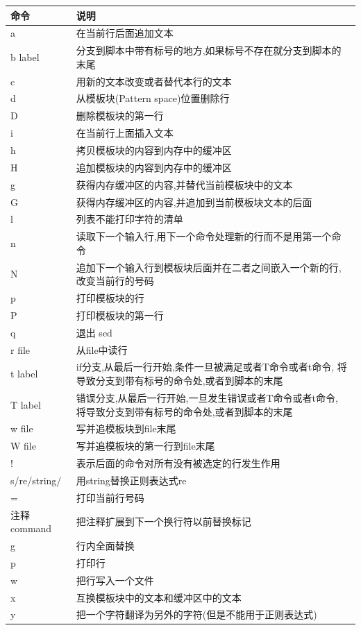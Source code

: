 \begin{tabular}{lp{25em}}
\toprule
命令       & 说明 \\
\midrule
a          & 在当前行后面追加文本 \\
b label    & 分支到脚本中带有标号的地方,如果标号不存在就分支到脚本的末尾 \\
c          & 用新的文本改变或者替代本行的文本 \\
d          & 从模板块(Pattern space)位置删除行 \\
D          & 删除模板块的第一行 \\
i          & 在当前行上面插入文本 \\
h          & 拷贝模板块的内容到内存中的缓冲区 \\
H          & 追加模板块的内容到内存中的缓冲区 \\
g          & 获得内存缓冲区的内容,并替代当前模板块中的文本 \\
G          & 获得内存缓冲区的内容,并追加到当前模板块文本的后面 \\
l          & 列表不能打印字符的清单 \\
n          & 读取下一个输入行,用下一个命令处理新的行而不是用第一个命令 \\
N          & 追加下一个输入行到模板块后面并在二者之间嵌入一个新的行,改变当前行的号码 \\
p          & 打印模板块的行 \\
P          & 打印模板块的第一行 \\
q          & 退出 sed \\
r file     & 从file中读行 \\
t label    & if分支,从最后一行开始,条件一旦被满足或者T命令或者t命令, 将导致分支到带有标号的命令处,或者到脚本的末尾 \\
T label    & 错误分支,从最后一行开始,一旦发生错误或者T命令或者t命令, 将导致分支到带有标号的命令处,或者到脚本的末尾 \\
w file     & 写并追模板块到file末尾 \\
W file     & 写并追模板块的第一行到file末尾 \\
!          & 表示后面的命令对所有没有被选定的行发生作用 \\
s/re/string/ & 用string替换正则表达式re \\
=          & 打印当前行号码 \\
注释command & 把注释扩展到下一个换行符以前替换标记 \\
g           & 行内全面替换 \\
p           & 打印行 \\
w           & 把行写入一个文件 \\
x           & 互换模板块中的文本和缓冲区中的文本 \\
y           & 把一个字符翻译为另外的字符(但是不能用于正则表达式) \\
\bottomrule
\end{tabular}

